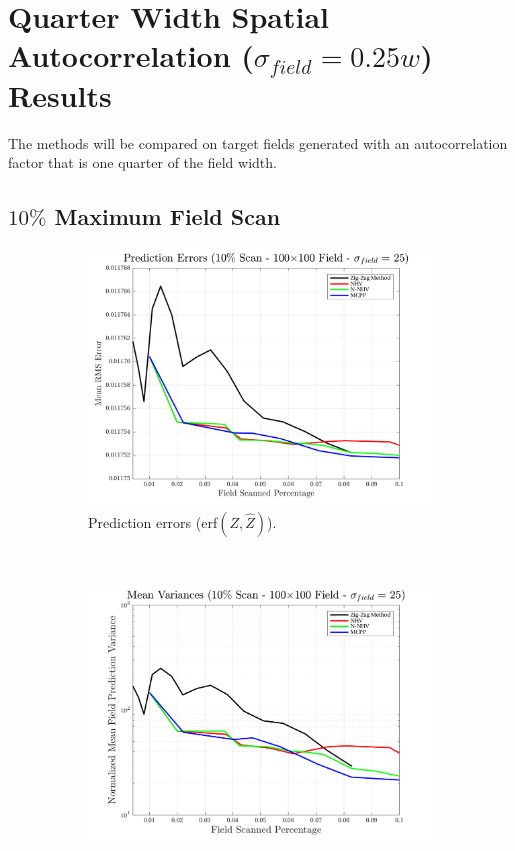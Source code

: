 \section{Quarter Width Spatial Autocorrelation ($\sigma_{field} = 0.25w$) Results}
The methods will be compared on target fields generated with an autocorrelation factor that is one quarter of the field width.

\clearpage
\subsection{$10\%$ Maximum Field Scan}
\begin{figure}[htb!]
    \centering
    \begin{subfigure}[t]{0.65\textwidth}
        \centering
        \includegraphics[width=\linewidth]{figures/hbresults/pred_errs_10p_100x100_sf_25_seed_2.png}
        \captionsetup{skip=0.20\baselineskip,size=footnotesize}
        \caption{Prediction errors (erf$(Z,\hat{Z})$).}
        \label{fig:prederrs_sigma25_p10_s2}
    \end{subfigure}%
    \\
    \begin{subfigure}[t]{0.65\textwidth}
        \centering
        \includegraphics[width=\linewidth]{figures/hbresults/vars_10p_100x100_sf_25_seed_2.png}

\end{subfigure}
\end{figure}
